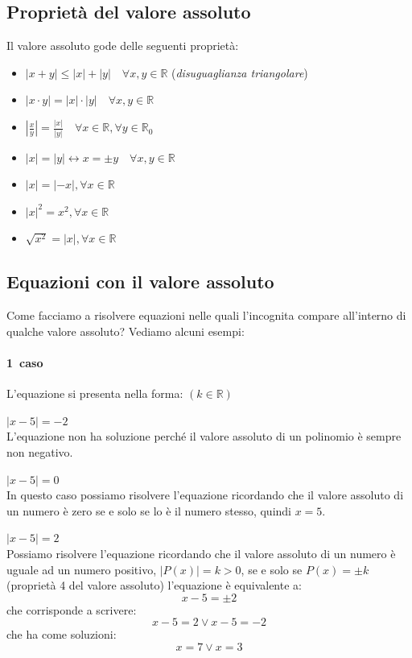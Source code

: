\subsection{Proprietà del valore assoluto}
Il valore assoluto gode delle seguenti proprietà:
\begin{itemize}
        \item \(|x+y|\leq |x|+|y| \quad \forall x,y \in \mathbb{R}\) \quad (\emph{disuguaglianza triangolare})
        \item \(|x\cdot y|=|x|\cdot |y| \quad  \forall x,y \in \mathbb{R}\)
        \item \(\left|\frac{x}{y} \right| =\frac{|x|}{|y|} \quad \forall x \in \mathbb{R}, 
\forall y \in \mathbb{R}_0\)
        \item \(|x|=|y| \longleftrightarrow x=\pm y \quad  \forall x,y \in \mathbb{R}\)
        \item \(|x|=|-x|, \forall x \in \mathbb{R}\)
        \item \(|x|^2=x^2, \forall x \in \mathbb{R}\)
        \item \(\sqrt{x^2}=|x|, \forall x \in \mathbb{R}\)
\end{itemize}

\subsection{Equazioni con il valore assoluto}
Come facciamo a risolvere equazioni nelle quali l'incognita compare all'interno 
di qualche valore assoluto? Vediamo alcuni esempi:
\paragraph{1\textdegree~caso} L'equazione si presenta nella forma:  
 \quad $(k\in \mathbb{R})$
\begin{esempio} 
$|x-5|=-2$ \\[4pt]
L'equazione non ha soluzione perché il valore assoluto di un polinomio è sempre non negativo.
\end{esempio}
\begin{esempio}  
$|x-5|=0$ \\[4pt]
In questo caso possiamo risolvere l'equazione ricordando che il valore assoluto di un numero è zero se e solo se 
lo è il numero stesso, quindi $x=5$.
\end{esempio}
\begin{esempio}  
$|x-5|=2$ \\[4pt]
Possiamo risolvere l'equazione ricordando che  il valore assoluto di un numero è uguale 
ad un numero positivo, $|P(x)|=k>0$, se e solo se $P(x)=\pm k$ (proprietà 4 del 
valore assoluto) l'equazione è equivalente a:
$$x-5=\pm 2$$
che corrisponde a scrivere:
$$x-5= 2 \vee x-5=-2$$
che ha come soluzioni:
$$x=7 \vee x=3$$
\end{esempio}

